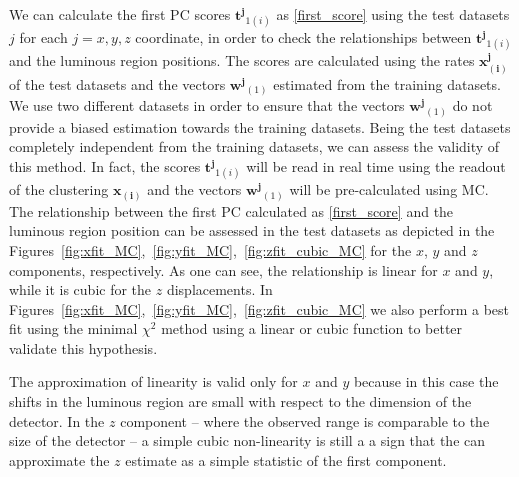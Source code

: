 We can calculate the first PC scores $\mathbf{t^j}_{1(i)}$ as \eqref{first_score} using the test datasets $j$ for each $j=x,y,z$ coordinate, in order to check the relationships between $\mathbf{t^{j}}_{1(i)}$ and the luminous region positions. The scores are calculated using the rates $\mathbf{x^{j}_{(i)}}$ of the test datasets and the vectors $\mathbf{w^{j}}_{(1)}$ estimated from the training datasets. We use two different datasets in order to ensure that the vectors $\mathbf{w^{j}}_{(1)}$ do not provide a biased estimation towards the training datasets. Being the test datasets completely independent from the training datasets, we can assess the validity of this method. In fact, the scores $\mathbf{t^{j}}_{1(i)}$ will be read in real time using the readout of the clustering $\mathbf{x_{(i)}}$ and the vectors $\mathbf{w^{j}}_{(1)}$ will be pre-calculated using MC. The relationship between the first PC calculated as \eqref{first_score} and the luminous region position can be assessed in the test datasets as depicted in the Figures~\ref{fig:xfit_MC},~\ref{fig:yfit_MC},~\ref{fig:zfit_cubic_MC} for the $x$, $y$ and $z$ components, respectively. As one can see, the relationship is linear for $x$ and $y$, while it is cubic for the $z$ displacements. In Figures~\ref{fig:xfit_MC},~\ref{fig:yfit_MC},~\ref{fig:zfit_cubic_MC} we also perform a best fit using the minimal $\chi^2$ method using a linear or cubic function to better validate this hypothesis. 

The approximation of linearity is valid only for $x$ and $y$ because in this case the shifts in the luminous region are small with respect to the dimension of the detector. In the $z$ component -- where the observed range is comparable to the size of the detector -- a simple cubic non-linearity is still a a sign that the can approximate the $z$ estimate as a simple statistic of the first component. 



